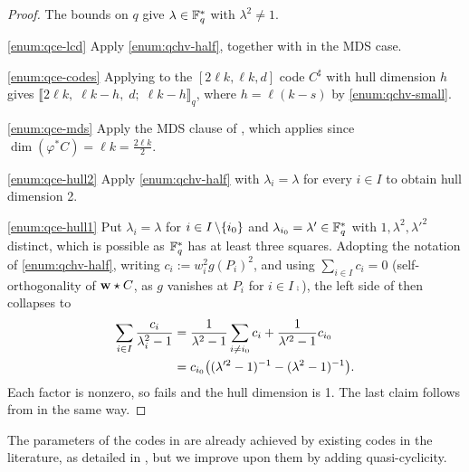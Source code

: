 \documentclass[twocolumn, 11pt]{scrartcl}
\begin{document}
\begin{proof}
    The bounds on $q$ give $\lambda\in\bbF_q^*$ with $\lambda^2\neq1$.
    
    \ref{enum:qce-lcd} Apply \ref{enum:qchv-half}, together with  in the MDS case.
    
    \ref{enum:qce-codes} Applying  to the $[2\ell k,\ell k,d]$ code $C^\sharp$ with hull dimension $h$ gives $\llbracket2\ell k,\;\ell k-h,\;d;\;\ell k-h\rrbracket_q$, where $h=\ell(k-s)$ by \ref{enum:qchv-small}.
    
    \ref{enum:qce-mds} Apply the MDS clause of , which applies since $\dim(\varphi^*C)=\ell k=\frac{2\ell k}{2}$.
    
    \ref{enum:qce-hull2} Apply \ref{enum:qchv-half} with $\lambda_i=\lambda$ for every $i\in I$ to obtain hull dimension 2.
    
    \ref{enum:qce-hull1} Put $\lambda_i=\lambda$ for $i\in I\bs\set{i_0}$ and $\lambda_{i_0}=\lambda'\in\bbF_q^*$ with $1,\lambda^2,\lambda'^2$ distinct, which is possible as $\bbF_q^*$ has at least three squares. Adopting the notation of \ref{enum:qchv-half}, writing $c_i:=w_i^2 g(P_i)^2$, and using $\sum_{i\in I} c_i=0$ (self-orthogonality of $\bfw\star C$, as $g$ vanishes at $P_i$ for $i\in I\comp$), the left side of  then collapses to
    \begin{align*}
        \sum_{i\in I}\frac{c_i}{\lambda_i^2-1}&=\frac{1}{\lambda^2-1}\sum_{i\neq i_0} c_i+\frac{1}{\lambda'^2-1} c_{i_0} \\
        &=c_{i_0}\pa[\big]{(\lambda'^2-1)^{-1}-(\lambda^2-1)^{-1}}.
    \end{align*}
    Each factor is nonzero, so  fails and the hull dimension is 1. The last claim follows from  in the same way.
\end{proof}

The parameters of the codes in  are already achieved by existing codes in the literature, as detailed in , but we improve upon them by adding quasi-cyclicity.
\end{document}
